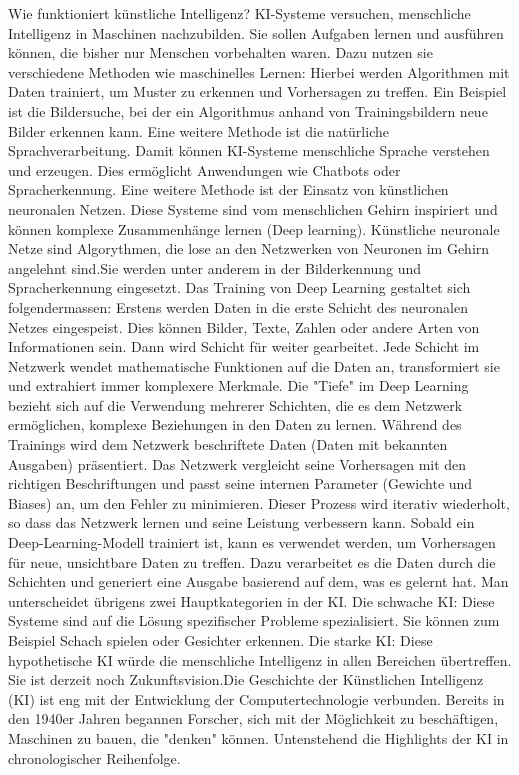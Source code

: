 \documentclass{article}
\begin{document}
Wie funktioniert künstliche Intelligenz? KI-Systeme versuchen, menschliche Intelligenz in Maschinen nachzubilden. Sie sollen Aufgaben lernen und ausführen können, die bisher nur Menschen vorbehalten waren. Dazu nutzen sie verschiedene Methoden wie maschinelles Lernen: Hierbei werden Algorithmen mit Daten trainiert, um Muster zu erkennen und Vorhersagen zu treffen. Ein Beispiel ist die Bildersuche, bei der ein Algorithmus anhand von Trainingsbildern neue Bilder erkennen kann. Eine weitere Methode ist die natürliche Sprachverarbeitung. Damit können KI-Systeme menschliche Sprache verstehen und erzeugen. Dies ermöglicht Anwendungen wie Chatbots oder Spracherkennung. Eine weitere Methode ist der Einsatz von künstlichen neuronalen Netzen. Diese Systeme sind vom menschlichen Gehirn inspiriert und können komplexe Zusammenhänge lernen (Deep learning). Künstliche neuronale Netze sind Algorythmen, die lose an den Netzwerken von Neuronen im Gehirn angelehnt sind.Sie werden unter anderem in der Bilderkennung und Spracherkennung eingesetzt. Das Training von Deep Learning gestaltet sich folgendermassen: Erstens werden Daten  in die erste Schicht des neuronalen Netzes eingespeist. Dies können Bilder, Texte, Zahlen oder andere Arten von Informationen sein. Dann wird Schicht für weiter gearbeitet. Jede Schicht im Netzwerk wendet mathematische Funktionen auf die Daten an, transformiert sie und extrahiert immer komplexere Merkmale. Die "Tiefe" im Deep Learning bezieht sich auf die Verwendung mehrerer Schichten, die es dem Netzwerk ermöglichen, komplexe Beziehungen in den Daten zu lernen. Während des Trainings wird dem Netzwerk beschriftete Daten (Daten mit bekannten Ausgaben) präsentiert. Das Netzwerk vergleicht seine Vorhersagen mit den richtigen Beschriftungen und passt seine internen Parameter (Gewichte und Biases) an, um den Fehler zu minimieren. Dieser Prozess wird iterativ wiederholt, so dass das Netzwerk lernen und seine Leistung verbessern kann. Sobald ein Deep-Learning-Modell trainiert ist, kann es verwendet werden, um Vorhersagen für neue, unsichtbare Daten zu treffen. Dazu verarbeitet es die Daten durch die Schichten und generiert eine Ausgabe basierend auf dem, was es gelernt hat.
Man unterscheidet übrigens zwei Hauptkategorien in der KI. Die schwache KI: Diese Systeme sind auf die Lösung spezifischer Probleme spezialisiert. Sie können zum Beispiel Schach spielen oder Gesichter erkennen. Die starke KI: Diese hypothetische KI würde die menschliche Intelligenz in allen Bereichen übertreffen. Sie ist derzeit noch Zukunftsvision.Die Geschichte der Künstlichen Intelligenz (KI) ist eng mit der Entwicklung der Computertechnologie verbunden. Bereits in den 1940er Jahren begannen Forscher, sich mit der Möglichkeit zu beschäftigen, Maschinen zu bauen, die "denken" können. Untenstehend die Highlights der KI in chronologischer Reihenfolge.
\end{document}
